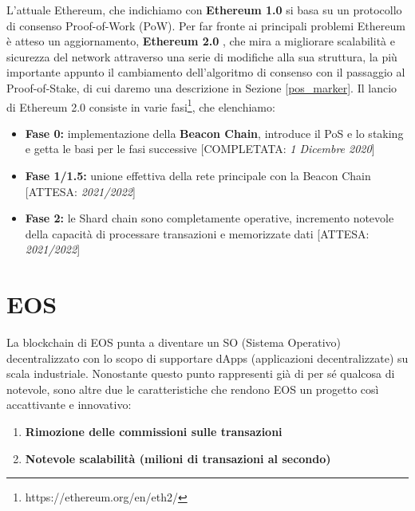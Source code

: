 L'attuale Ethereum, che indichiamo con \textbf{Ethereum 1.0} si basa su un protocollo di consenso Proof-of-Work (PoW). Per far fronte ai principali problemi Ethereum è atteso un aggiornamento, \textbf{Ethereum 2.0} \cite{provenzani2020Ethereum}, che mira a migliorare scalabilità e sicurezza del network attraverso una serie di modifiche alla sua struttura, la più importante appunto il cambiamento dell'algoritmo di consenso con il passaggio al Proof-of-Stake, di cui daremo una descrizione in Sezione \ref{pos_marker}. Il lancio di Ethereum 2.0 consiste in varie fasi\footnote{https://ethereum.org/en/eth2/}, che elenchiamo:

\begin{itemize}
    \item \textbf{Fase 0:} implementazione della \textbf{Beacon Chain}, introduce il PoS e lo staking e getta le basi per le fasi successive [COMPLETATA: \textit{1 Dicembre 2020}]
    \item \textbf{Fase 1/1.5:} unione effettiva della rete principale con la Beacon Chain [ATTESA: \textit{2021/2022}]
    \item \textbf{Fase 2:} le Shard chain sono completamente operative, incremento notevole della capacità di processare transazioni e memorizzate dati [ATTESA: \textit{2021/2022}]
\end{itemize}

\section{EOS}
La blockchain di EOS \cite{xu2018eos} punta a diventare un SO (Sistema Operativo) decentralizzato con lo scopo di supportare dApps (applicazioni decentralizzate) su scala industriale. Nonostante questo punto rappresenti già di per sé qualcosa di notevole, sono altre due le caratteristiche che rendono EOS un progetto così accattivante e innovativo:

\begin{enumerate}
    \item \textbf{Rimozione delle commissioni sulle transazioni}
    \item \textbf{Notevole scalabilità (milioni di transazioni al secondo)}
\end{enumerate}


